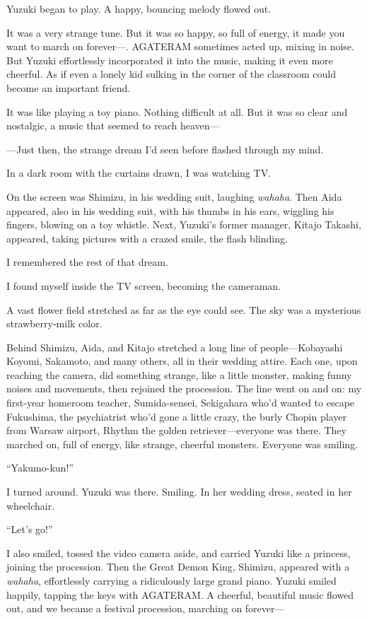 \documentclass[
    a4paper,
    12pt,
    twoside,
    openany,
    UTF8,
    fontset=windows
]{ctexbook}
\begin{document}
Yuzuki began to play. A happy, bouncing melody flowed out.

It was a very strange tune. But it was so happy, so full of energy, it made you want to march on forever---. AGATERAM sometimes acted up, mixing in noise. But Yuzuki effortlessly incorporated it into the music, making it even more cheerful. As if even a lonely kid sulking in the corner of the classroom could become an important friend.

It was like playing a toy piano. Nothing difficult at all. But it was so clear and nostalgic, a music that seemed to reach heaven---

---Just then, the strange dream I'd seen before flashed through my mind.

In a dark room with the curtains drawn, I was watching TV.

On the screen was Shimizu, in his wedding suit, laughing \textit{wahaha}. Then Aida appeared, also in his wedding suit, with his thumbs in his ears, wiggling his fingers, blowing on a toy whistle. Next, Yuzuki's former manager, Kitajo Takashi, appeared, taking pictures with a crazed smile, the flash blinding.

I remembered the rest of that dream.

I found myself inside the TV screen, becoming the cameraman.

A vast flower field stretched as far as the eye could see. The sky was a mysterious strawberry-milk color.

Behind Shimizu, Aida, and Kitajo stretched a long line of people---Kobayashi Koyomi, Sakamoto, and many others, all in their wedding attire. Each one, upon reaching the camera, did something strange, like a little monster, making funny noises and movements, then rejoined the procession. The line went on and on: my first-year homeroom teacher, Sumida-sensei, Sekigahara who'd wanted to escape Fukushima, the psychiatrist who'd gone a little crazy, the burly Chopin player from Warsaw airport, Rhythm the golden retriever---everyone was there. They marched on, full of energy, like strange, cheerful monsters. Everyone was smiling.

``Yakumo-kun!''

I turned around. Yuzuki was there. Smiling. In her wedding dress, seated in her wheelchair.

``Let's go!''

I also smiled, tossed the video camera aside, and carried Yuzuki like a princess, joining the procession. Then the Great Demon King, Shimizu, appeared with a \textit{wahaha}, effortlessly carrying a ridiculously large grand piano. Yuzuki smiled happily, tapping the keys with AGATERAM. A cheerful, beautiful music flowed out, and we became a festival procession, marching on forever---
\end{document}
